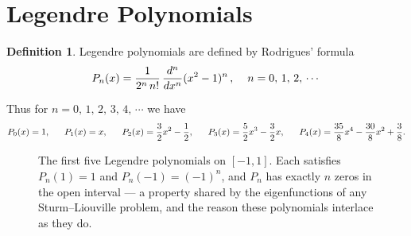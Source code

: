 \documentclass[12pt,a4paper]{report}
\theoremstyle{definition}
\newtheorem{defn}[thm]{Definition}
\theoremstyle{plain}
\begin{document}
\section{Legendre Polynomials}
\begin{defn}
Legendre polynomials are defined by Rodrigues' formula
$$P_n(x) = \frac{1}{2^n\, n!}\, \frac{d^n}{dx^n}(x^2-1)^n\, , \hspace{0.4cm} n = 0, \, 1, \, 2, \, \cdots$$
\end{defn}

Thus for $n = 0, \, 1, \, 2, \, 3, \, 4, \, \cdots$ we have $$P_0(x) = 1, \,\hspace{0.5cm}  P_1(x) = x, \,\hspace{0.5cm} P_2(x) = \frac{3}{2}x^2 - \frac{1}{2}, \,\hspace{0.5cm} P_3(x) = \frac{5}{2}x^3 - \frac{3}{2}x, \,\hspace{0.5cm} P_4(x) = \frac{35}{8}x^4 - \frac{30}{8}x^2 + \frac{3}{8}.$$



\begin{figure}[H]
\centering
{}
\caption{The first five Legendre polynomials on $[-1,1]$. Each satisfies
$P_n(1)=1$ and $P_n(-1)=(-1)^n$, and $P_n$ has exactly $n$ zeros in the open
interval --- a property shared by the eigenfunctions of any Sturm--Liouville
problem, and the reason these polynomials interlace as they do.}
\label{fig:legendre}
\end{figure}
\end{document}
